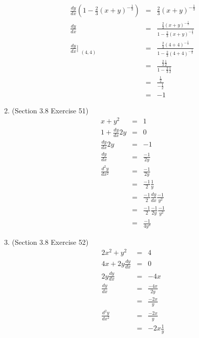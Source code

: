 \documentclass{article}
\begin{document}
\begin{enumerate}
\begin{eqnarray}
            \frac{dy}{dx}\left(1 - \frac{2}{3}\left(x + y\right)^{-\frac{1}{3}}\right) &=& \frac{2}{3}\left(x + y\right)^{-\frac{1}{3}} \\
            \frac{dy}{dx} &=& \frac{\frac{2}{3}\left(x + y\right)^{-\frac{1}{3}}}{1 - \frac{2}{3}\left(x + y\right)^{-\frac{1}{3}}} \\
            \frac{dy}{dx}\Bigr|_{\substack{(4,4)}} &=& \frac{\frac{2}{3}\left(4 + 4\right)^{-\frac{1}{3}}}{1 - \frac{2}{3}\left(4 + 4\right)^{-\frac{1}{3}}} \\
                                                   &=& \frac{\frac{2}{3}\frac{1}{2}}{1 - \frac{2}{3}\frac{1}{2}} \\
                                                   &=& \frac{\frac{1}{2}}{- \frac{1}{2}} \\
                                                   &=& -1
        \end{eqnarray}
    \item (Section 3.8 Exercise 51)
        \begin{eqnarray}
            x + y^2 &=& 1 \\
            1 + \frac{dy}{dx}2y &=& 0 \\
            \frac{dy}{dx}2y &=& -1 \\
            \frac{dy}{dx} &=& \frac{-1}{2y} \\
            \frac{d^2y}{dx^2} &=& \frac{-1}{2y} \\
                              &=& \frac{-1}{2}\frac{1}{y} \\
                              &=& \frac{-1}{2}\frac{dy}{dx}\frac{-1}{y^2} \\
                              &=& \frac{-1}{2}\frac{-1}{2y}\frac{-1}{y^2} \\
                              &=& \frac{-1}{4y^3}
        \end{eqnarray}
    \item (Section 3.8 Exercise 52)
        \begin{eqnarray}
            2x^2 + y^2 &=& 4 \\
            4x + 2y\frac{dy}{dx} &=& 0 \\
            2y\frac{dy}{dx} &=& -4x \\
            \frac{dy}{dx} &=& \frac{-4x}{2y} \\
                          &=& \frac{-2x}{y} \\
            \frac{d^2y}{dx^2} &=& \frac{-2x}{y} \\
                              &=& -2x\frac{1}{y} \\

\end{eqnarray}
\end{enumerate}
\end{document}
